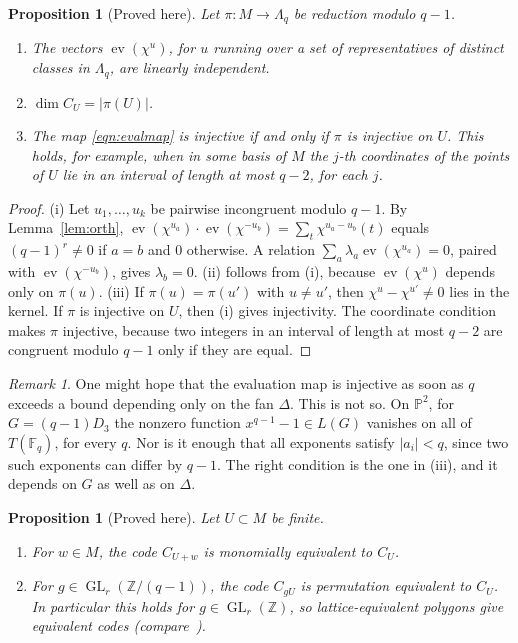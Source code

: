 \documentclass[12pt,letterpaper]{article}
\numberwithin{equation}{section}
\newtheorem{proposition}[theorem]{Proposition}
\theoremstyle{definition}
\theoremstyle{remark}
\newtheorem{remark}[theorem]{Remark}
\DeclareMathOperator{\ev}{ev}
\DeclareMathOperator{\GL}{GL}
\newcommand{\Z}{\mathbb{Z}}
\newcommand{\PP}{\mathbb{P}}
\newcommand{\Fq}{\mathbb{F}_q}
\newcommand{\Lq}{\Lambda_q}
\begin{document}
\begin{proposition}[Proved here]\label{prop:dim}
Let $\pi:M\to\Lq$ be reduction modulo $q-1$.
\begin{enumerate}[label=(\roman*)]
\item The vectors $\ev(\chi^u)$, for $u$ running over a set of
representatives of distinct classes in $\Lq$, are linearly independent.
\item $\dim C_U=|\pi(U)|$.
\item The map \eqref{eqn:evalmap} is injective if and only if $\pi$ is
injective on $U$. This holds, for example, when in some basis of $M$ the $j$-th
coordinates of the points of $U$ lie in an interval of length at most $q-2$,
for each $j$.
\end{enumerate}
\end{proposition}

\begin{proof}
(i) Let $u_1,\dots,u_k$ be pairwise incongruent modulo $q-1$. By
Lemma~\ref{lem:orth},
$\ev(\chi^{u_a})\cdot\ev(\chi^{-u_b})=\sum_t\chi^{u_a-u_b}(t)$ equals
$(q-1)^r\ne0$ if $a=b$ and $0$ otherwise. A relation
$\sum_a\lambda_a\ev(\chi^{u_a})=0$, paired with $\ev(\chi^{-u_b})$, gives
$\lambda_b=0$. (ii) follows from (i), because $\ev(\chi^u)$ depends only on
$\pi(u)$. (iii) If $\pi(u)=\pi(u')$ with $u\ne u'$, then
$\chi^u-\chi^{u'}\ne0$ lies in the kernel. If $\pi$ is injective on $U$, then
(i) gives injectivity. The coordinate condition makes $\pi$ injective, because
two integers in an interval of length at most $q-2$ are congruent modulo
$q-1$ only if they are equal.
\end{proof}

\begin{remark}\label{rem:bound-q}
One might hope that the evaluation map is injective as soon as $q$ exceeds a
bound depending only on the fan $\Delta$. This is not so. On $\PP^2$, for
$G=(q-1)D_3$ the nonzero function $x^{q-1}-1\in L(G)$ vanishes on all of
$T(\Fq)$, for every $q$. Nor is it enough that all exponents satisfy
$|a_i|<q$, since two such exponents can differ by $q-1$. The right condition
is the one in (iii), and it depends on $G$ as well as on $\Delta$.
\end{remark}

\begin{proposition}[Proved here]\label{prop:equiv}
Let $U\subset M$ be finite.
\begin{enumerate}[label=(\roman*)]
\item For $w\in M$, the code $C_{U+w}$ is monomially equivalent to $C_U$.
\item For $g\in\GL_r(\Z/(q-1))$, the code $C_{gU}$ is permutation equivalent
to $C_U$. In particular this holds for $g\in\GL_r(\Z)$, so lattice-equivalent
polygons give equivalent codes (compare~\cite{LS07}).
\end{enumerate}
\end{proposition}
\end{document}
